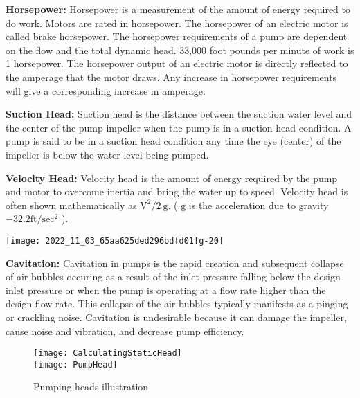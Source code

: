 \textbf{Horsepower: }  Horsepower is a measurement of the amount of energy required to do work. Motors are rated in horsepower. The horsepower of an electric motor is called brake horsepower. The horsepower requirements of a pump are dependent on the flow and the total dynamic head.  33,000 foot pounds per minute of work is 1 horsepower.  The horsepower output of an electric motor is directly reflected to the amperage that the motor draws. Any increase in horsepower requirements will give a corresponding increase in amperage.

\textbf{Suction Head: } Suction head is the distance between the suction water level and the center of the pump impeller when the pump is in a suction head condition. A pump is said to be in a suction head condition any time the eye (center) of the impeller is below the water level being pumped.

\textbf{Velocity Head: }  Velocity head is the amount of energy required by the pump and motor to overcome inertia and bring the water up to speed. Velocity head is often shown mathematically as $\mathrm{V}^{2} / 2 \mathrm{~g}$. ( $\mathrm{g}$ is the acceleration due to gravity $-32.2 \mathrm{ft} / \mathrm{sec}^{2}$ ).
\begin{center}
\texttt{[image: 2022\_11\_03\_65aa625ded296bdfd01fg-20]}
\end{center}



\textbf{Cavitation: }   Cavitation in pumps is the rapid creation and subsequent collapse of air bubbles occuring as a result of the inlet pressure falling below the design inlet pressure or when the pump is operating at a flow rate higher than the design flow rate. This collapse of the air bubbles typically manifests as a pinging or crackling noise.  Cavitation is undesirable because it can damage the impeller, cause noise and vibration, and decrease pump efficiency.
\begin{figure}[h]
\begin{center}
\texttt{[image: CalculatingStaticHead]}\\
\texttt{[image: PumpHead]}\\
\caption{Pumping heads illustration} 
\end{center}
\end{figure}



